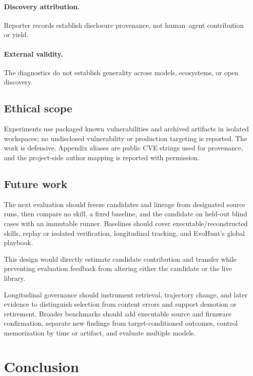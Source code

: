 \documentclass[11pt]{article}
\begin{document}
\paragraph{Discovery attribution.}
Reporter records establish disclosure provenance, not human--agent contribution or yield.

\paragraph{External validity.}
The diagnostics do not establish generality across models, ecosystems, or open discovery.

\subsection{Ethical scope}
\label{sec:ethics}

Experiments use packaged known vulnerabilities and archived artifacts in isolated
workspaces; no undisclosed vulnerability or production targeting is reported.  The work
is defensive.  Appendix aliases are public CVE strings used for provenance, and the
project-side author mapping is reported with permission.

\subsection{Future work}
\label{sec:agenda}

The next evaluation should freeze candidates and lineage from designated source runs,
then compare no skill, a fixed baseline, and the candidate on held-out blind cases with
an immutable runner.  Baselines should cover executable/reconstructed skills, replay or
isolated verification, longitudinal tracking, and EvoHunt's global playbook.

This design would directly estimate candidate contribution and transfer while preventing
evaluation feedback from altering either the candidate or the live library.

Longitudinal governance should instrument retrieval, trajectory change, and later
evidence to distinguish selection from content errors and support demotion or retirement.
Broader benchmarks should add executable source and firmware confirmation, separate new
findings from target-conditioned outcomes, control memorization by time or artifact, and
evaluate multiple models.

\section{Conclusion}
\label{sec:conclusion}
\end{document}
